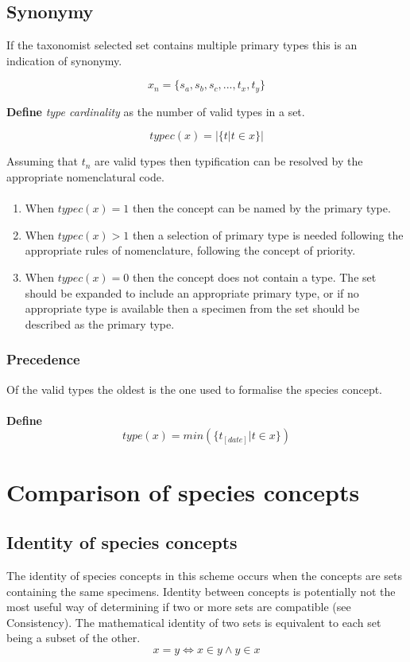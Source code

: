 \documentclass{article}
\begin{document}
   \subsection{Synonymy}
   If the taxonomist selected set contains multiple primary types this is an indication of synonymy.
   
   \[x_n = \{s_a, s_b, s_c, ..., t_x, t_y\}\]
   
   \textbf{Define} \textit{type cardinality} as the number of valid types in a set.
   
   \[typec(x) = \left|\{t|t \in x\}\right| \]
   
   Assuming that $t_n$ are valid types then typification can be resolved by the appropriate nomenclatural code.
   \paragraph{}
   \begin{enumerate}
   \item When $typec(x) = 1$ then the concept can be named by the primary type.
   \item When $typec(x) > 1$ then a selection of primary type is needed following the appropriate rules of nomenclature, following the concept of priority.
   \item When $typec(x) = 0$ then the concept does not contain a type. The set should be expanded to include an appropriate primary type, or if no appropriate type is available then a specimen from the set should be described as the primary type.
   \end{enumerate}
   
   \subsubsection{Precedence}
   Of the valid types the oldest is the one used to formalise the species concept.
   \paragraph{}
   \textbf{Define}
   \[type(x) = min(\{t_{[date]}|t \in x\}) \]
   
   \section{Comparison of species concepts}
   \subsection{Identity of species concepts}
   The identity of species concepts in this scheme occurs when the concepts are sets containing the same specimens. Identity between concepts is potentially not the most useful way of determining if two or more sets are compatible (see Consistency). The mathematical identity of two sets is equivalent to each set being a subset of the other.
   \[x = y \iff x \in y \land y \in x\]
   
\end{document}
